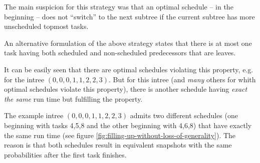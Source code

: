 The main suspicion for this strategy was that an optimal schedule -- in the beginning -- does not ``switch'' to the next subtree if the current subtree has more unscheduled topmost tasks.


An alternative formulation of the above strategy states that there is at most one task having both scheduled and non-scheduled predecessors that are leaves. 

It can be easily seen that there are optimal schedules violating this property, e.g. for the intree $(0,0,0,1,1,2,2,3)$. But for this intree (and \emph{many} others for whith optimal schedules violate this property), there is another schedule having \emph{exact the same} run time but fulfilling the property.

The example intree $(0,0,0,1,1,2,2,3)$ admits two different schedules (one beginning with tasks 4,5,8 and the other beginning with 4,6,8) that have exactly the same run time (see figure \ref{fig:filling-up-without-loss-of-generality}). The reason is that both schedules result in equivalent snapshots with the same probabilities after the first task finishes.

